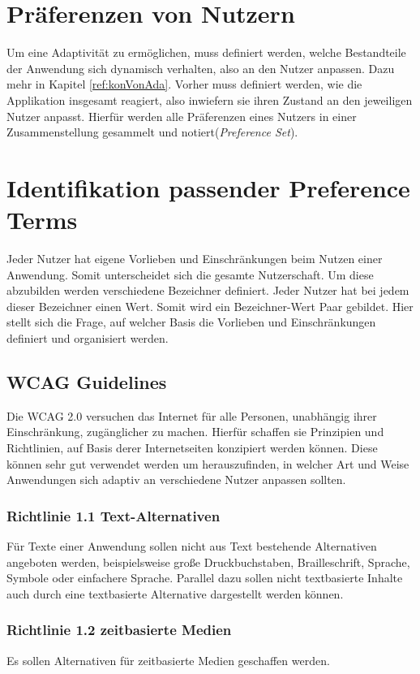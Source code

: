 \documentclass[12pt, paper=a4, bibtotoc, toc=listof, headsepline=true]{scrreprt}
\begin{document}
	\section{Präferenzen von Nutzern}
	Um eine Adaptivität zu ermöglichen, muss definiert werden, welche Bestandteile der Anwendung sich dynamisch verhalten, also an den Nutzer anpassen. Dazu mehr in Kapitel \ref{ref:konVonAda}. Vorher muss definiert werden, wie die Applikation insgesamt reagiert, also inwiefern sie ihren Zustand an den jeweiligen Nutzer anpasst. Hierfür werden alle Präferenzen eines Nutzers in einer Zusammenstellung gesammelt und notiert(\emph{Preference Set}).
	\section{Identifikation passender Preference Terms}
	Jeder Nutzer hat eigene Vorlieben und Einschränkungen beim Nutzen einer Anwendung. Somit unterscheidet sich die gesamte Nutzerschaft. Um diese abzubilden werden verschiedene Bezeichner definiert. Jeder Nutzer hat bei jedem dieser Bezeichner einen Wert. Somit wird ein Bezeichner-Wert Paar gebildet. Hier stellt sich die Frage, auf welcher Basis die Vorlieben und Einschränkungen definiert und organisiert werden.
		\subsection{WCAG Guidelines}
		Die \ac{WCAG 2.0} versuchen das Internet für alle Personen, unabhängig ihrer Einschränkung, zugänglicher zu machen. Hierfür schaffen sie Prinzipien und Richtlinien, auf Basis derer Internetseiten konzipiert werden können. Diese können sehr gut verwendet werden um herauszufinden, in welcher Art und Weise Anwendungen sich adaptiv an verschiedene Nutzer anpassen sollten.
			\subsubsection{Richtlinie 1.1 Text-Alternativen}
			Für Texte einer Anwendung sollen nicht aus Text bestehende Alternativen angeboten werden, beispielsweise große Druckbuchstaben, Brailleschrift, Sprache, Symbole oder einfachere Sprache. Parallel dazu sollen nicht textbasierte Inhalte auch durch eine textbasierte Alternative dargestellt werden können. 
			\subsubsection{Richtlinie 1.2 zeitbasierte Medien}
			Es sollen Alternativen für zeitbasierte Medien geschaffen werden.
\end{document}
